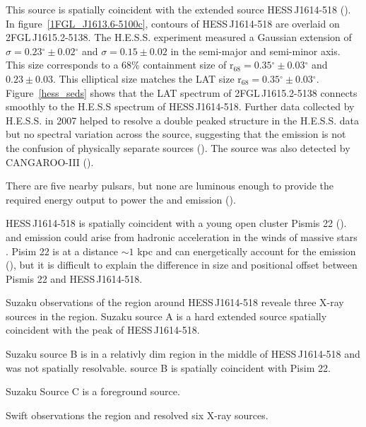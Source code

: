 \documentclass[12pt,preprint]{aastex}
\newcommand{\gev}{\text{GeV}\xspace}
\newcommand{\tev}{\text{TeV}\xspace}
\newcommand{\rsixeight}{{\ensuremath{\text{r}_{68}}}\xspace}
\renewcommand{\deg}{\ensuremath{^\circ}\xspace}
\renewcommand{\approx}{\sim\!\xspace}
\begin{document}
This source is spatially coincident with the extended
\tev source HESS\,J1614-518 (\cite{hess_plane_survey}). In
figure~\ref{1FGL_J1613.6-5100c}, contours of HESS\,J1614-518 are overlaid
on 2FGL\,J1615.2-5138.  The H.E.S.S. experiment measured a Gaussian
extension of $\sigma=0.23\deg\pm0.02\deg$ and $\sigma=0.15\pm0.02$
in the semi-major and semi-minor axis. This size corresponds
to a 68\% containment size of $\rsixeight=0.35\deg\pm0.03\deg$
and $0.23\pm0.03$.  This elliptical size matches the LAT size
$\rsixeight=0.35\deg\pm0.03\deg$.  Figure~\ref{hess_seds} shows
that the LAT spectrum of 2FGL\,J1615.2-5138 connects smoothly to
the H.E.S.S spectrum of HESS\,J1614-518.  Further data collected by
H.E.S.S. in 2007 helped to resolve a double peaked structure in the
H.E.S.S. data but no spectral variation across the source, suggesting
that the emission is not the confusion of physically separate sources
(\cite{closer_look_hess_j1614-518}).  The source was also detected by
CANGAROO-III (\cite{cangaroo_j1614-518}).

There are five nearby pulsars, but none are luminous enough to
provide the required energy output to power the \gev and \tev emission
(\cite{closer_look_hess_j1614-518}).

HESS\,J1614-518 is spatially coincident with a young open cluster Pismis
22 (\cite{hess_1614_landi_atel,closer_look_hess_j1614-518}).
\gev and \tev emission could arise from
hadronic acceleration in the winds of massive stars
\cite{cosmic_rays_and_gamma-rays_from_ob_stars,gamma-ray_production_in_young_open_clusters}.
Pisim 22 is at a distance $\approx1$ kpc and can energetically account
for the \tev emission (\cite{closer_look_hess_j1614-518}), but
it is difficult to explain the difference in size and positional offset
between Pismis 22 and HESS\,J1614-518.


Suzaku observations of the region around HESS\,J1614-518 reveale three
X-ray sources in the region. Suzaku source A is a hard extended source
spatially coincident with the peak of HESS\,J1614-518. 

Suzaku source B is
in a relativly dim region in the middle of HESS\,J1614-518 and was not
spatially resolvable. source B is spatially coincident with Pisim 22.

Suzaku Source C is a foreground source.

Swift observations the region and resolved six X-ray sources.

\end{document}
